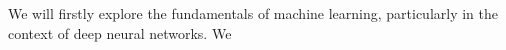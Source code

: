 We will firstly explore the fundamentals of machine learning, particularly in the context of deep neural networks. We 